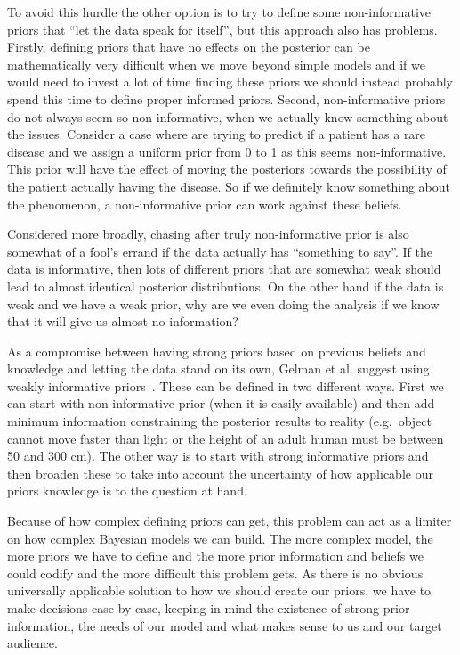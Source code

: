 \documentclass[12pt,a4paper,leqno]{report}
\theoremstyle{plain}
\theoremstyle{definition}
\theoremstyle{remark}
\begin{document}
To avoid this hurdle the other option is to try to define some non-informative
priors that ``let the data speak for itself'', but this approach also has
problems. Firstly, defining priors that have no effects on the posterior can be mathematically
very difficult when we move beyond simple models and if we would need
to invest a lot of time finding these priors we should instead probably spend this time
to define proper informed priors. Second, non-informative priors do not always
seem so non-informative, when we actually know something about the issues.
Consider a case where are trying to predict if a patient has a rare disease
and we assign a uniform prior from 0 to 1 as this seems non-informative. This
prior will have the effect of moving the posteriors towards the
possibility of the patient actually having the disease. So if we definitely know
something about the phenomenon, a non-informative prior can work against these
beliefs.\ \cite{gelman}

Considered more broadly, chasing after truly non-informative prior is also
somewhat of a fool's errand if the data actually has ``something to say''.
If the data is informative, then lots of different priors that are somewhat weak
should lead to almost identical posterior distributions. On the other hand if the data is weak and we
have a weak prior, why are we even doing the analysis if we know that it will
give us almost no information?\ \cite{gelman}

As a compromise between having strong priors based on previous beliefs and knowledge and
letting the data stand on its own, Gelman et al.
suggest using weakly informative priors\ \cite{gelman}. These can be defined in two different
ways. First we can start with non-informative prior (when it is easily
available) and then add minimum information constraining the posterior results
to reality (e.g.\ object cannot move faster than light or the height of an adult human
must be between 50 and 300 cm). The other way is to start with strong informative
priors and then broaden these to take into account the uncertainty of
how applicable our priors knowledge is to the question at hand.

Because of how complex defining priors can get, this problem can act as a limiter on
how complex Bayesian models we can build. The more complex model, the more priors we
have to define and the more prior information and beliefs we could codify and
the more difficult this problem gets. As there is no obvious universally applicable
solution to how we should create our priors, we have to make decisions case by case,
keeping in mind the existence of strong prior information, the needs of our model and
what makes sense to us and our target audience.
\end{document}
